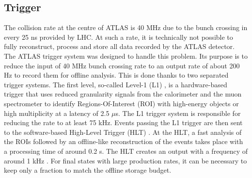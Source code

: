 \subsection{Trigger}
\label{chap2:ATLAS:Trigger}
The collision rate at the centre of ATLAS is 40 MHz due to the bunch crossing in every 25 ns provided by LHC. At such a rate, it is technically not possible to fully reconstruct, process and store all data recorded by the ATLAS detector. The ATLAS trigger system was designed to handle this problem. Its purpose  is to reduce the input of 40 MHz bunch crossing rate to an output rate of about 200 Hz to record them for offline analysis. This is done thanks to two separated trigger systems. The first level, so-called Level-1 (L1) \cite{Trigger_L1}, is a hardware-based trigger that uses reduced granularity signals from the calorimeter and the muon spectrometer to identify Regions-Of-Interest (ROI) with high-energy objects or high multiplicity at a latency of 2.5 $\mu$s. The L1 trigger system is responsible for reducing the rate to at least 75 kHz. Events passing the L1 trigger are then sent to the software-based High-Level Trigger (HLT) \cite{Trigger_HLT}. At the HLT, a fast analysis of the ROIs followed by an offline-like reconstruction of the events takes place with a processing time of around 0.2 s. The HLT creates an output with a frequency of around 1 kHz \cite{DQ}. For final states with large production rates, it can be necessary to keep only a fraction to match the offline storage budget.

